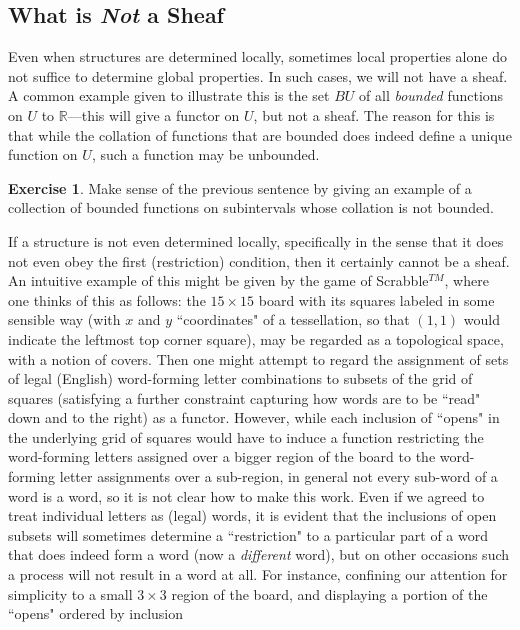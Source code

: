 \documentclass[11pt]{book}
\theoremstyle{definition}
\theoremstyle{definition}
\theoremstyle{definition}
\theoremstyle{theorem}
\theoremstyle{definition}
\newtheorem{exercise}{Exercise}[section]
\begin{document}
\subsection{What is \textit{Not} a Sheaf}
Even when structures are determined locally, sometimes local properties alone do not suffice to determine global properties. In such cases, we will not have a sheaf. A common example given to illustrate this is the set $BU$ of all \textit{bounded} functions on $U$ to $\mathbb{R}$---this will give a functor on $U$, but not a sheaf. The reason for this is that while the collation of functions that are bounded does indeed define a unique function on $U$, such a function may be unbounded. \par
\begin{exercise}
	Make sense of the previous sentence by giving an example of a collection of bounded functions on subintervals whose collation is not bounded.
\end{exercise}
If a structure is not even determined locally, specifically in the sense that it does not even obey the first (restriction) condition, then it certainly cannot be a sheaf. An intuitive example of this might be given by the game of Scrabble$^{TM}$, where one thinks of this as follows: the $15 \times 15$ board with its squares labeled in some sensible way (with $x$ and $y$ ``coordinates" of a tessellation, so that $(1,1)$ would indicate the leftmost top corner square), may be regarded as a topological space, with a notion of covers. Then one might attempt to regard the assignment of sets of legal (English) word-forming letter combinations to subsets of the grid of squares (satisfying a further constraint capturing how words are to be ``read" down and to the right) as a functor. However, while each inclusion of ``opens" in the underlying grid of squares would have to induce a function restricting the word-forming letters assigned over a bigger region of the board to the word-forming letter assignments over a sub-region, in general not every sub-word of a word is a word, so it is not clear how to make this work. Even if we agreed to treat individual letters as (legal) words, it is evident that the inclusions of open subsets will sometimes determine a ``restriction" to a particular part of a word that does indeed form a word (now a \textit{different} word), but on other occasions such a process will not result in a word at all. For instance, confining our attention for simplicity to a small $3 \times 3$ region of the board, and displaying a portion of the ``opens" ordered by inclusion
\end{document}

